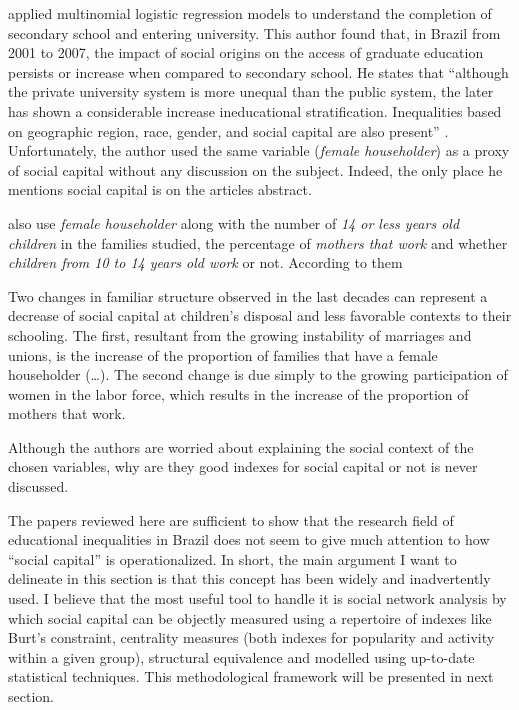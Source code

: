 \documentclass[a4paper, 12pt, openright, oneside, article, german, french, brazil, english]{abntex2}
\begin{document}
 applied multinomial logistic regression models to understand the completion of secondary school and entering university. This author found that, in Brazil from 2001 to 2007, the impact of social origins on the access of graduate education persists or increase when compared to secondary school. He states that ``although the private university system is more unequal than the public system, the later has shown a considerable increase ineducational stratification. Inequalities based on geographic region, race, gender, and social capital are also present'' \cite[p. 430]{mont2011estratificaccao}. Unfortunately, the author used the same variable (\textit{female householder}) as a proxy of social capital without any discussion on the subject. Indeed, the only place he mentions social capital is on the articles abstract.


 also use \textit{female householder} along with the number of \textit{14 or less years old children} in the families studied, the percentage of \textit{mothers that work} and whether \textit{children from 10 to 14 years old work} or not. According to them

\begin{citacao}
	Two changes in familiar structure observed in the last decades can represent a decrease of social capital at children's disposal and less favorable contexts to their schooling. The first, resultant from the growing instability of marriages and unions, is the increase of the proportion of families that have a female householder (\dots). The second change is due simply to the growing participation of women in the labor force, which results in the increase of the proportion of mothers that work. \cite{silva2000tendencias}
\end{citacao}

Although the authors are worried about explaining the social context of the chosen variables, why are they good indexes for social capital or not is never discussed.

The papers reviewed here are sufficient to show that the research field of educational inequalities in Brazil does not seem to give much attention to how ``social capital'' is operationalized. In short, the main argument I want to delineate in this section is that this concept has been widely and inadvertently used. I believe that the most useful tool to handle it is social network analysis by which social capital can be objectly measured using a repertoire of indexes like Burt's constraint, centrality measures (both indexes for popularity and activity within a given group), structural equivalence and modelled using up-to-date statistical techniques. This methodological framework will be presented in next section.
\end{document}
